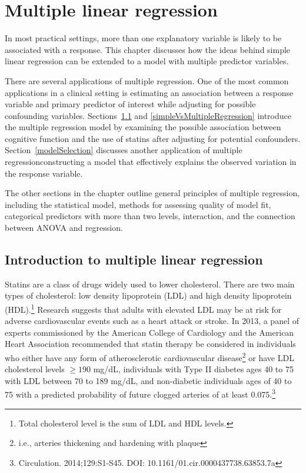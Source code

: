 
\chapter{Multiple linear regression}
\label{multipleLinearRegression}

In most practical settings, more than one explanatory variable is likely to be associated with a response. This chapter discusses how the ideas behind simple linear regression can be extended to a model with multiple predictor variables. 

There are several applications of multiple regression. One of the most common applications in a clinical setting is estimating an association between a response variable and primary predictor of interest while adjusting for possible confounding variables. Sections~\ref{introductionMultipleLinearRegression} and \ref{simpleVsMultipleRegression} introduce the multiple regression model by examining the possible association between cognitive function and the use of statins after adjusting for potential confounders. Section~\ref{modelSelection} discusses another application of multiple regression\textemdash constructing a model that effectively explains the observed variation in the response variable. 

The other sections in the chapter outline general principles of multiple regression, including the statistical model, methods for assessing quality of model fit, categorical predictors with more than two levels, interaction, and the connection between ANOVA and regression.



\section{Introduction to multiple linear regression}
\label{introductionMultipleLinearRegression}

Statins are a class of drugs widely used to lower cholesterol. There are two main types of cholesterol: low density lipoprotein (LDL) and high density lipoprotein (HDL).\footnote{Total cholesterol level is the sum of LDL and HDL levels.} Research suggests that adults with elevated LDL may be at risk for adverse cardiovascular events such as a heart attack or stroke. In 2013, a panel of experts commissioned by the American College of Cardiology and the American Heart Association recommended that statin therapy be considered in individuals who either have any form of atherosclerotic cardiovascular disease\footnote{i.e., arteries thickening and hardening with plaque} or have LDL cholesterol levels $\geq 190$ mg/dL, individuals with Type II diabetes ages 40 to 75 with LDL between 70 to 189 mg/dL, and non-diabetic individuals ages of 40 to 75 with a predicted probability of future clogged arteries of at least 0.075.\footnote{Circulation. 2014;129:S1-S45. DOI: 10.1161/01.cir.0000437738.63853.7a}

